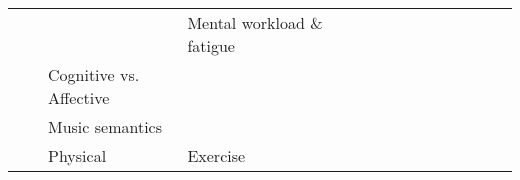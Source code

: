 \begin{tabular}{p{1.5cm}p{1.5cm}p{1.5cm}p{1.5cm}p{0.6cm}p{0.6cm}p{0.6cm}p{0.6cm}p{0.6cm}p{0.6cm}p{0.6cm}p{0.6cm}p{0.6cm}p{0.6cm}p{0.6cm}}
                                &                 &                   & Mental workload \& fatigue &                                                             &                                                                                                                             &                                                                        &                       \cite{Yin2017} &                                                            &                      &                         &                               &                     &                         &                                                                      \\
                                &                 & Cognitive vs. Affective &   &                                                             &                                                                                                                             &                                                                        &                 \cite{Bashivan2016b} &                                                            &                      &                         &                               &                     &                         &                                                                      \\
                                &                 & Music semantics &   &                                                             &                                                                                                           \cite{Stober2014} &                                                                        &                                      &                                                            &                      &                         &                               &                     &                         &                                                                      \\
                                &                 & Physical & Exercise &                                                             &                                                                                                            \cite{Ghosh2018} &                                                                        &                                      &                                                            &                      &                         &          \cite{Gordienko2017} &                     &                         &                                                                      \\

\end{tabular}
